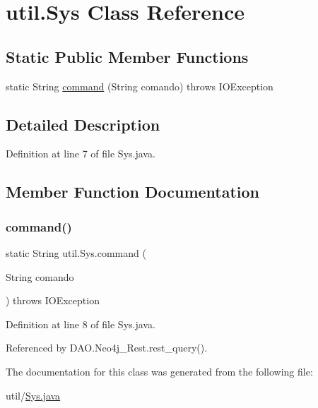 \hypertarget{classutil_1_1Sys}{}\section{util.\+Sys Class Reference}
\label{classutil_1_1Sys}
\subsection*{Static Public Member Functions}
\begin{DoxyCompactItemize}
\item 
static String \hyperlink{classutil_1_1Sys_a09f9de1caea875db232c91562c49c6a8}{command} (String comando)  throws I\+O\+Exception 
\end{DoxyCompactItemize}


\subsection{Detailed Description}


Definition at line 7 of file Sys.\+java.



\subsection{Member Function Documentation}
\hypertarget{classutil_1_1Sys_a09f9de1caea875db232c91562c49c6a8}{}\label{classutil_1_1Sys_a09f9de1caea875db232c91562c49c6a8} 
\subsubsection{\texorpdfstring{command()}{command()}}
{\footnotesize\ttfamily static String util.\+Sys.\+command (\begin{DoxyParamCaption}\item[{String}]{comando }\end{DoxyParamCaption}) throws I\+O\+Exception\hspace{0.3cm}{\ttfamily [static]}}



Definition at line 8 of file Sys.\+java.



Referenced by D\+A\+O.\+Neo4j\+\_\+\+Rest.\+rest\+\_\+query().



The documentation for this class was generated from the following file\+:\begin{DoxyCompactItemize}
\item 
util/\hyperlink{Sys_8java}{Sys.\+java}\end{DoxyCompactItemize}
